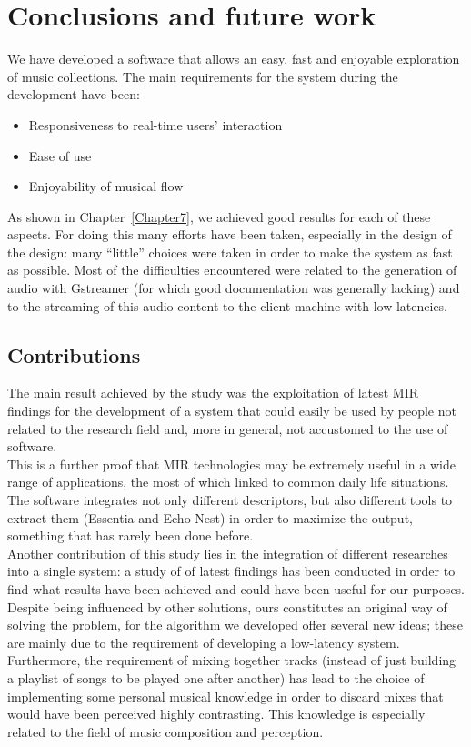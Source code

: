 \chapter{Conclusions and future work} 

\label{Chapter8} 


We have developed a software that allows an easy, fast and enjoyable exploration of music collections. The main requirements for the system during the development have been:
\begin{itemize}
\item Responsiveness to real-time users' interaction
\item Ease of use
\item Enjoyability of musical flow
\end{itemize}
As shown in Chapter~\ref{Chapter7}, we achieved good results for each of these aspects. For doing this many efforts have been taken, especially in the design of the design: many ``little'' choices were taken in order to make the system as fast as possible. Most of the difficulties encountered were related to the generation of audio with Gstreamer (for which good documentation was generally lacking) and to the streaming of this audio content to the client machine with low latencies.  

\section{Contributions}
The main result achieved by the study was the exploitation of latest MIR findings for the development of a system that could easily be used by people not related to the research field and, more in general, not accustomed to the use of software. \\
This is a further proof that MIR technologies may be extremely useful in a wide range of applications, the most of which linked to common daily life situations. The software integrates not only different descriptors, but also different tools to extract them (Essentia and Echo Nest) in order to maximize the output, something that has rarely been done before.\\
Another contribution of this study lies in the integration of different researches into a single system: a study of of latest findings has been conducted in order to find what results have been achieved and could have been useful for our purposes. Despite being influenced by other solutions, ours constitutes an original way of solving the problem, for the algorithm we developed offer several new ideas; these are mainly due to the requirement of developing a low-latency system. Furthermore, the requirement of mixing together tracks (instead of just building a playlist of songs to be played one after another) has lead to the choice of implementing some personal musical knowledge in order to discard mixes that would have been perceived highly contrasting. This knowledge is especially related to the field of music composition and perception.\\

